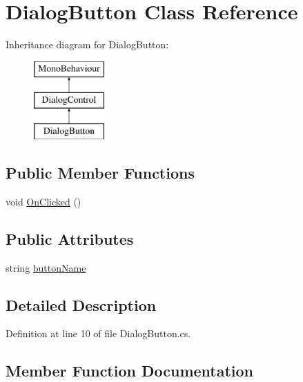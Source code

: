 \hypertarget{class_dialog_button}{}\section{Dialog\+Button Class Reference}
\label{class_dialog_button}
Inheritance diagram for Dialog\+Button\+:\begin{figure}[H]
\begin{center}
\leavevmode
\includegraphics[height=3.000000cm]{class_dialog_button}
\end{center}
\end{figure}
\subsection*{Public Member Functions}
\begin{DoxyCompactItemize}
\item 
void \hyperlink{class_dialog_button_a064a58d3b59b9a66641833c89a5f0868}{On\+Clicked} ()
\end{DoxyCompactItemize}
\subsection*{Public Attributes}
\begin{DoxyCompactItemize}
\item 
string \hyperlink{class_dialog_button_a16f68c40934b4d891eafbb0c0d8fd4d2}{button\+Name}
\end{DoxyCompactItemize}


\subsection{Detailed Description}


Definition at line 10 of file Dialog\+Button.\+cs.



\subsection{Member Function Documentation}
\mbox{\label{class_dialog_button_a064a58d3b59b9a66641833c89a5f0868}} 

